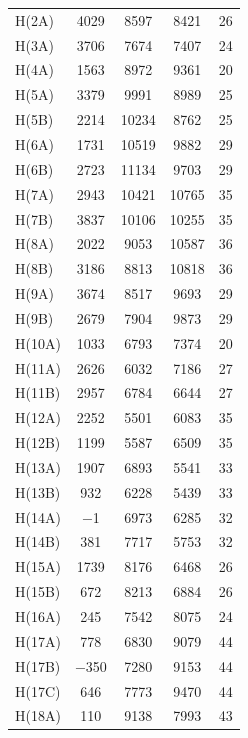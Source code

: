 \begin{center}
\tablelasttail{\bottomrule}
 {\footnotesize \singlespacing
\begin{supertabular}{lcccc}
H(2A)&4029&8597&8421&26\\
H(3A)&3706&7674&7407&24\\
H(4A)&1563&8972&9361&20\\
H(5A)&3379&9991&8989&25\\
H(5B)&2214&10234&8762&25\\
H(6A)&1731&10519&9882&29\\
H(6B)&2723&11134&9703&29\\
H(7A)&2943&10421&10765&35\\
H(7B)&3837&10106&10255&35\\
H(8A)&2022&9053&10587&36\\
H(8B)&3186&8813&10818&36\\
H(9A)&3674&8517&9693&29\\
H(9B)&2679&7904&9873&29\\
H(10A)&1033&6793&7374&20\\
H(11A)&2626&6032&7186&27\\
H(11B)&2957&6784&6644&27\\
H(12A)&2252&5501&6083&35\\
H(12B)&1199&5587&6509&35\\
H(13A)&1907&6893&5541&33\\
H(13B)&932&6228&5439&33\\
H(14A)&$-$1&6973&6285&32\\
H(14B)&381&7717&5753&32\\
H(15A)&1739&8176&6468&26\\
H(15B)&672&8213&6884&26\\
H(16A)&245&7542&8075&24\\
H(17A)&778&6830&9079&44\\
H(17B)&$-$350&7280&9153&44\\
H(17C)&646&7773&9470&44\\
H(18A)&110&9138&7993&43\\

\end{supertabular}}
\end{center}
